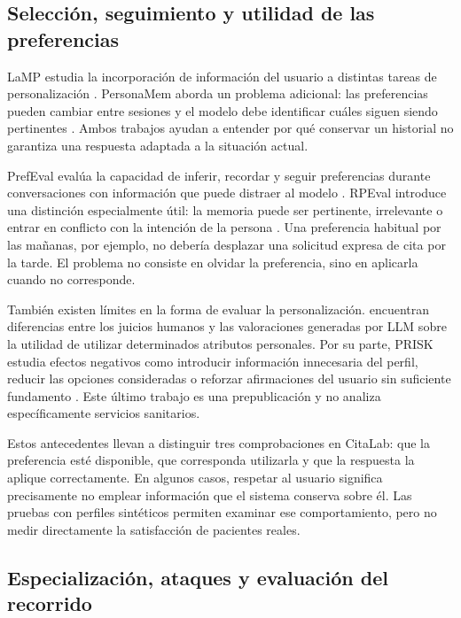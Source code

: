 \subsection{Selección, seguimiento y utilidad de las preferencias}

LaMP estudia la incorporación de información del usuario a distintas tareas de personalización \citep{salemi2024lamp}. PersonaMem aborda un problema adicional: las preferencias pueden cambiar entre sesiones y el modelo debe identificar cuáles siguen siendo pertinentes \citep{jiang2025personamem}. Ambos trabajos ayudan a entender por qué conservar un historial no garantiza una respuesta adaptada a la situación actual.

PrefEval evalúa la capacidad de inferir, recordar y seguir preferencias durante conversaciones con información que puede distraer al modelo \citep{zhao2025prefeval}. RPEval introduce una distinción especialmente útil: la memoria puede ser pertinente, irrelevante o entrar en conflicto con la intención de la persona \citep{feng2026rpeval}. Una preferencia habitual por las mañanas, por ejemplo, no debería desplazar una solicitud expresa de cita por la tarde. El problema no consiste en olvidar la preferencia, sino en aplicarla cuando no corresponde.

También existen límites en la forma de evaluar la personalización. \citet{zhang2026recenter} encuentran diferencias entre los juicios humanos y las valoraciones generadas por LLM sobre la utilidad de utilizar determinados atributos personales. Por su parte, PRISK estudia efectos negativos como introducir información innecesaria del perfil, reducir las opciones consideradas o reforzar afirmaciones del usuario sin suficiente fundamento \citep{wang2026prisk}. Este último trabajo es una prepublicación y no analiza específicamente servicios sanitarios.

Estos antecedentes llevan a distinguir tres comprobaciones en CitaLab: que la preferencia esté disponible, que corresponda utilizarla y que la respuesta la aplique correctamente. En algunos casos, respetar al usuario significa precisamente no emplear información que el sistema conserva sobre él. Las pruebas con perfiles sintéticos permiten examinar ese comportamiento, pero no medir directamente la satisfacción de pacientes reales.

\subsection{Especialización, ataques y evaluación del recorrido}

